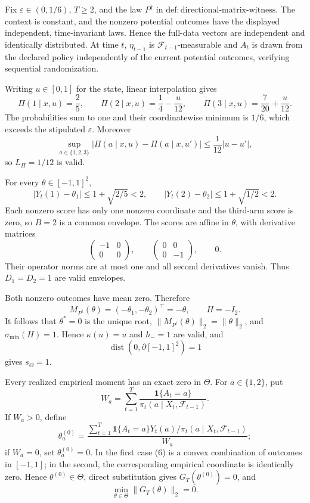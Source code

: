 Fix \(\varepsilon\in(0,1/6)\), \(T\ge2\), and the law \(P^\dagger\) in
\(\mathrm{def:directional\text{-}matrix\text{-}witness}\).  The context is
constant, and the nonzero potential outcomes have the displayed independent,
time-invariant laws.  Hence the full-data vectors are independent and
identically distributed.  At time \(t\), \(\eta_{t-1}\) is
\(\mathcal F_{t-1}\)-measurable and \(A_t\) is drawn from the declared policy
independently of the current potential outcomes, verifying sequential
randomization.

Writing \(u\in[0,1]\) for the state, linear interpolation gives
\[
 \Pi(1\mid x,u)=\frac25,\qquad
 \Pi(2\mid x,u)=\frac14-\frac{u}{12},\qquad
 \Pi(3\mid x,u)=\frac7{20}+\frac{u}{12}.
\tag{1}
\]
The probabilities sum to one and their coordinatewise minimum is \(1/6\),
which exceeds the stipulated \(\varepsilon\).  Moreover
\[
 \sup_{a\in\{1,2,3\}}|\Pi(a\mid x,u)-\Pi(a\mid x,u')|
 \le\frac1{12}|u-u'|,
\tag{2}
\]
so \(L_\Pi=1/12\) is valid.

For every \(\theta\in[-1,1]^2\),
\[
 |Y_t(1)-\theta_1|\le1+\sqrt{2/5}<2,
 \qquad |Y_t(2)-\theta_2|\le1+\sqrt{1/2}<2.
\tag{3}
\]
Each nonzero score has only one nonzero coordinate and the third-arm score is
zero, so \(B=2\) is a common envelope.  The scores are affine in \(\theta\),
with derivative matrices
\[
 \begin{pmatrix}-1&0\\0&0\end{pmatrix},\qquad
 \begin{pmatrix}0&0\\0&-1\end{pmatrix},\qquad 0.
\]
Their operator norms are at most one and all second derivatives vanish.
Thus \(D_1=D_2=1\) are valid envelopes.

Both nonzero outcomes have mean zero.  Therefore
\[
 M_{P^\dagger}(\theta)=(-\theta_1,-\theta_2)^\top=-\theta,
 \qquad H=-I_2.
\tag{4}
\]
It follows that \(\theta^*=0\) is the unique root,
\(\|M_{P^\dagger}(\theta)\|_2=\|\theta\|_2\), and
\(\sigma_{\min}(H)=1\).  Hence \(\kappa(u)=u\) and \(h_-=1\) are valid,
and
\[
 \operatorname{dist}(0,\partial[-1,1]^2)=1
\tag{5}
\]
gives \(s_\Theta=1\).

Every realized empirical moment has an exact zero in \(\Theta\).  For
\(a\in\{1,2\}\), put
\[
 W_a=\sum_{t=1}^T\frac{\mathbf1\{A_t=a\}}
 {\pi_t(a\mid X_t,\mathcal F_{t-1})}.
\]
If \(W_a>0\), define
\[
 \theta_a^{(0)}=
 \frac{\sum_{t=1}^T\mathbf1\{A_t=a\}Y_t(a)/
 \pi_t(a\mid X_t,\mathcal F_{t-1})}{W_a};
\tag{6}
\]
if \(W_a=0\), set \(\theta_a^{(0)}=0\).  In the first case (6) is a convex
combination of outcomes in \([-1,1]\); in the second, the corresponding
empirical coordinate is identically zero.  Hence
\(\theta^{(0)}\in\Theta\), direct substitution gives
\(G_T(\theta^{(0)})=0\), and
\[
 \min_{\theta\in\Theta}\|G_T(\theta)\|_2=0.
\tag{7}
\]

